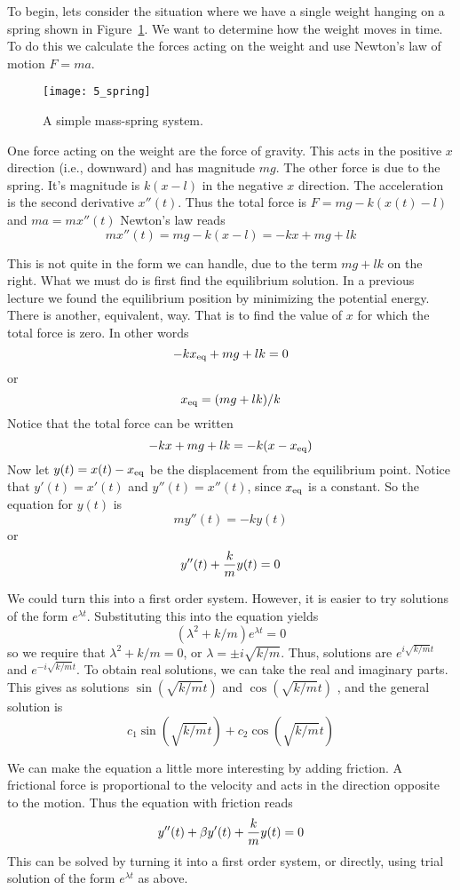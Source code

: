 To begin, lets consider the situation where we have a single weight
hanging on a spring shown in Figure~\ref{fig_spring}.  We want to
determine how the weight moves in time. To do this we calculate the
forces acting on the weight and use Newton's law of motion $F=ma$.

\begin{figure}
\centerline{\texttt{[image: 5\_spring]}}
\caption{A simple mass-spring system.
\label{fig_spring}}
\end{figure}

One force acting on the weight are the force of gravity. This acts in
the positive $x$ direction (i.e., downward) and has magnitude
$mg$. The other force is due to the spring. It's magnitude is $k(x-l)$
in the negative $x$ direction. The acceleration is the second
derivative $x''(t)$. Thus the total force is $F = mg - k(x(t)-l)$ and
$ma=mx''(t)$ Newton's law reads
\[
mx''(t) = mg - k(x-l) = -kx + mg + lk
\]

This is not quite in the form we can handle, due to the term $mg+lk$
on the right. What we must do is first find the equilibrium
solution. In a previous lecture we found the equilibrium position by
minimizing the potential energy.  There is another, equivalent,
way. That is to find the value of $x$ for which the total force is
zero. In other words
\[
-kx_{\rm eq} + mg + lk = 0
\]
or 
\[
x_{\rm eq} = (mg + lk)/k
\]
Notice that the total force can be written
\[
-kx + mg + lk = -k(x-x_{\rm eq})
\]
Now let $y(t)=x(t)-x_{\rm eq}$ be the displacement from the
equilibrium point.  Notice that $y'(t)=x'(t)$ and $y''(t) = x''(t)$,
since $x_{\rm eq}$ is a constant.  So the equation for $y(t)$ is
\[
m y''(t) = -ky(t)
\]
or 
\[
y''(t) + {{k}\over{m}}y(t) = 0
\]

We could turn this into a first order system. However, it is easier to
try solutions of the form $e^{\lambda t}$. Substituting this into the
equation yields
\[
(\lambda^2 + k/m)e^{\lambda t}=0
\]
so we require that $\lambda^2 + k/m=0$, or $\lambda=\pm i\sqrt{k/m}$.
Thus, solutions are $e^{i\sqrt{k/m}t}$ and $e^{-i\sqrt{k/m}t}$. To
obtain real solutions, we can take the real and imaginary parts. This
gives as solutions $\sin(\sqrt{k/m} t)$ and $\cos(\sqrt{k/m} t)$ , and
the general solution is
\[
c_1\sin(\sqrt{k/m} t) + c_2\cos(\sqrt{k/m} t)
\]

We can make the equation a little more interesting by adding friction.
A frictional force is proportional to the velocity and acts in the
direction opposite to the motion. Thus the equation with friction
reads
\[
y''(t) + \beta y'(t) + {{k}\over{m}}y(t) = 0
\]
This can be solved by turning it into a first order system, or
directly, using trial solution of the form $e^{\lambda t}$ as above.

